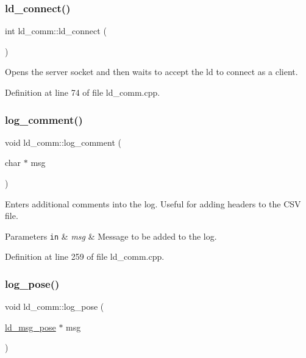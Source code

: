 \subsubsection{\texorpdfstring{ld\+\_\+connect()}{ld\_connect()}}
{\footnotesize\ttfamily int ld\+\_\+comm\+::ld\+\_\+connect (\begin{DoxyParamCaption}{ }\end{DoxyParamCaption})}

Opens the server socket and then waits to accept the ld to connect as a client. 

Definition at line 74 of file ld\+\_\+comm.\+cpp.

\mbox{\label{classld__comm_ad47e957c7397e42e82128ee143d8b143}} 
\subsubsection{\texorpdfstring{log\+\_\+comment()}{log\_comment()}}
{\footnotesize\ttfamily void ld\+\_\+comm\+::log\+\_\+comment (\begin{DoxyParamCaption}\item[{char $\ast$}]{msg }\end{DoxyParamCaption})}

Enters additional comments into the log. Useful for adding headers to the C\+SV file. 
\begin{DoxyParams}[1]{Parameters}
\mbox{\tt in}  & {\em msg} & Message to be added to the log. \\
\hline
\end{DoxyParams}


Definition at line 259 of file ld\+\_\+comm.\+cpp.

\mbox{\label{classld__comm_a1219ef460b9a510a448704f57ce0412e}} 
\subsubsection{\texorpdfstring{log\+\_\+pose()}{log\_pose()}}
{\footnotesize\ttfamily void ld\+\_\+comm\+::log\+\_\+pose (\begin{DoxyParamCaption}\item[{\mbox{\hyperlink{structld__msg__pose}{ld\+\_\+msg\+\_\+pose}} $\ast$}]{msg }\end{DoxyParamCaption})}

